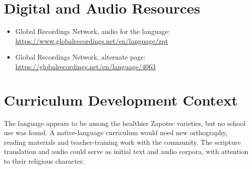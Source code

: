 \documentclass[12pt]{article}
\begin{document}
\section{Digital and Audio Resources}
\begin{itemize}
\item Global Recordings Network, audio for the language: \url{https://www.globalrecordings.net/en/language/zpt}
\item Global Recordings Network, alternate page: \url{https://globalrecordings.net/en/language/4063}
\end{itemize}

\section{Curriculum Development Context}
The language appears to be among the healthier Zapotec varieties, but no school use was found. A native-language curriculum would need new orthography, reading materials and teacher-training work with the community. The scripture translation and audio could serve as initial text and audio corpora, with attention to their religious character.
\end{document}
